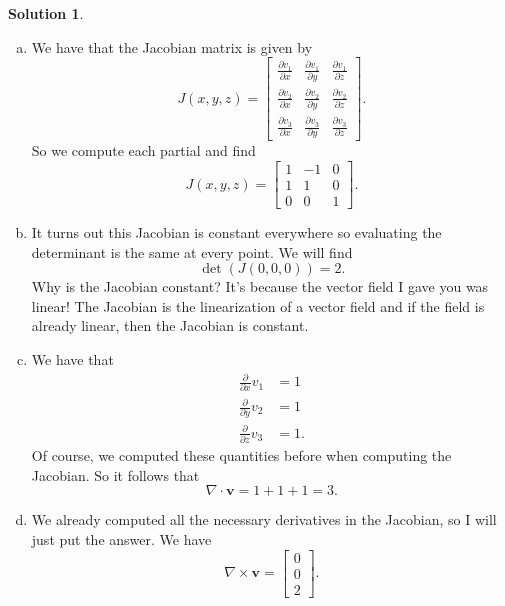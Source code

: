 \documentclass[12pt]{report} %
\theoremstyle{definition}
\newtheorem{solution}{Solution}
\begin{document}
\begin{solution}
\begin{enumerate}[(a)]
    \item We have that the Jacobian matrix is given by
    \[
    J(x,y,z) = \begin{bmatrix} \frac{\partial v_1}{\partial x} & \frac{\partial v_1}{\partial y} & \frac{\partial v_1}{\partial z} \\ 
    \frac{\partial v_2}{\partial x} & \frac{\partial v_2}{\partial y} & \frac{\partial v_2}{\partial z} \\
    \frac{\partial v_3}{\partial x} & \frac{\partial v_3}{\partial y} & \frac{\partial v_3}{\partial z} \end{bmatrix}.
    \]
    So we compute each partial and find
    \[
    J(x,y,z) = \begin{bmatrix} 1 & -1 & 0 \\ 1 & 1 & 0 \\ 0 & 0 & 1 \end{bmatrix}.
    \]
    \item It turns out this Jacobian is constant everywhere so evaluating the determinant is the same at every point.  We will find
    \[
    \det(J(0,0,0))= 2.
    \]
    Why is the Jacobian constant? It's because the vector field I gave you was linear! The Jacobian is the linearization of a vector field and if the field is already linear, then the Jacobian is constant.
    \item We have that
    \begin{align*}
        \frac{\partial}{\partial x} v_1 &=1\\
        \frac{\partial}{\partial y} v_2 &=1\\
        \frac{\partial}{\partial z} v_3 &=1.
    \end{align*}
    Of course, we computed these quantities before when computing the Jacobian. So it follows that
    \[
    \nabla \cdot \mathbf{v} = 1+1+1 = 3.
    \]
    \item We already computed all the necessary derivatives in the Jacobian, so I will just put the answer. We have
    \[
    \nabla \times \mathbf{v} = \begin{bmatrix} 0 \\ 0 \\ 2 \end{bmatrix}.
    \]
\end{enumerate}
\end{solution}
\vspace*{.5cm}
\end{document}
